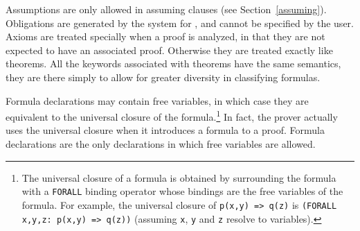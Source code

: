 Assumptions are only allowed in assuming clauses (see
Section~\ref{assuming}).  Obligations are generated by the system for
\tccs, and cannot be specified by the user.  Axioms are treated
specially when a proof is analyzed, in that they are not expected to
have an associated proof.  Otherwise they are treated exactly like
theorems.  All the keywords associated with theorems have the same
semantics, they are there simply to allow for greater diversity in
classifying formulas.

Formula declarations may contain free variables, in
which case they are equivalent to the universal closure of the formula.\footnote{The universal closure of a formula is
obtained by surrounding the formula with a \texttt{FORALL} binding
operator whose bindings are the free variables of the formula.  For
example, the universal closure of \texttt{p(x,y) => q(z)} is
\texttt{(FORALL x,y,z:\ p(x,y) => q(z))} (assuming \texttt{x}, \texttt{y}
and \texttt{z} resolve to variables).} In fact, the prover actually uses
the universal closure when it introduces a formula to a proof.  Formula
declarations are the only declarations in which free variables are
allowed.










